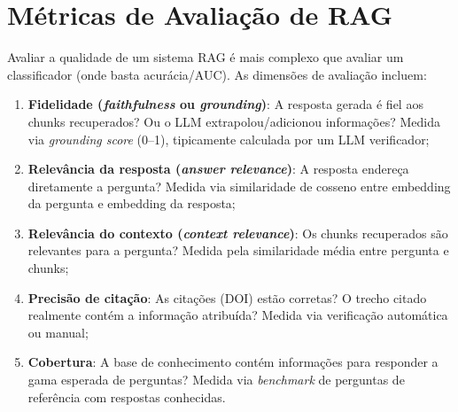 
\section{Métricas de Avaliação de RAG}

Avaliar a qualidade de um sistema RAG é mais complexo que avaliar um classificador (onde basta acurácia/AUC). As dimensões de avaliação incluem:

\begin{enumerate}
    \item \textbf{Fidelidade (\textit{faithfulness} ou \textit{grounding})}: A resposta gerada é fiel aos chunks recuperados? Ou o LLM extrapolou/adicionou informações? Medida via \textit{grounding score} (0--1), tipicamente calculada por um LLM verificador;

    \item \textbf{Relevância da resposta (\textit{answer relevance})}: A resposta endereça diretamente a pergunta? Medida via similaridade de cosseno entre embedding da pergunta e embedding da resposta;

    \item \textbf{Relevância do contexto (\textit{context relevance})}: Os chunks recuperados são relevantes para a pergunta? Medida pela similaridade média entre pergunta e chunks;

    \item \textbf{Precisão de citação}: As citações (DOI) estão corretas? O trecho citado realmente contém a informação atribuída? Medida via verificação automática ou manual;

    \item \textbf{Cobertura}: A base de conhecimento contém informações para responder a gama esperada de perguntas? Medida via \textit{benchmark} de perguntas de referência com respostas conhecidas.
\end{enumerate}

